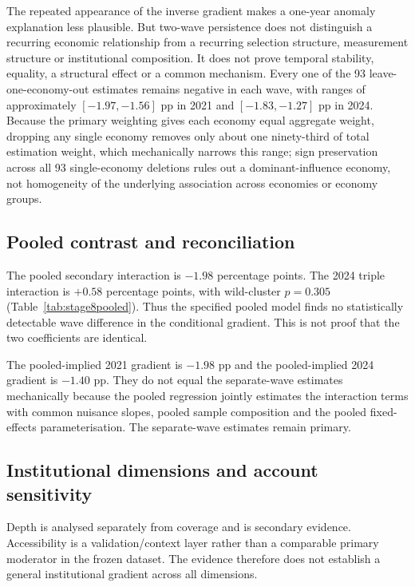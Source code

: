 

The repeated appearance of the inverse gradient makes a one-year anomaly explanation less
plausible. But two-wave persistence does not distinguish a recurring economic relationship
from a recurring selection structure, measurement structure or institutional composition.
It does not prove temporal stability, equality, a structural effect or a common mechanism.
Every one of the 93 leave-one-economy-out estimates remains negative in each
wave, with ranges of approximately $[-1.97,-1.56]$ pp in 2021 and $[-1.83,-1.27]$ pp in
2024. Because the primary weighting gives each economy equal aggregate weight, dropping
any single economy removes only about one ninety-third of total estimation weight, which
mechanically narrows this range; sign preservation across all 93 single-economy deletions
rules out a dominant-influence economy, not homogeneity of the underlying association
across economies or economy groups.

\subsection{Pooled contrast and reconciliation}

The pooled secondary interaction is $-1.98$ percentage points. The 2024 triple interaction
is $+0.58$ percentage points, with wild-cluster $p=0.305$ (Table~\ref{tab:stage8pooled}).
Thus the specified pooled model finds no statistically detectable wave difference in the
conditional gradient. This is not proof that the two coefficients are identical.



The pooled-implied 2021 gradient is $-1.98$ pp and the pooled-implied 2024 gradient is
$-1.40$ pp. They do not equal the separate-wave estimates mechanically because the pooled
regression jointly estimates the interaction terms with common nuisance slopes, pooled
sample composition and the pooled fixed-effects parameterisation. The separate-wave
estimates remain primary.

\subsection{Institutional dimensions and account sensitivity}

Depth is analysed separately from coverage and is secondary evidence. Accessibility is a
validation/context layer rather than a comparable primary moderator in the frozen dataset.
The evidence therefore does not establish a general institutional gradient across all
dimensions.

